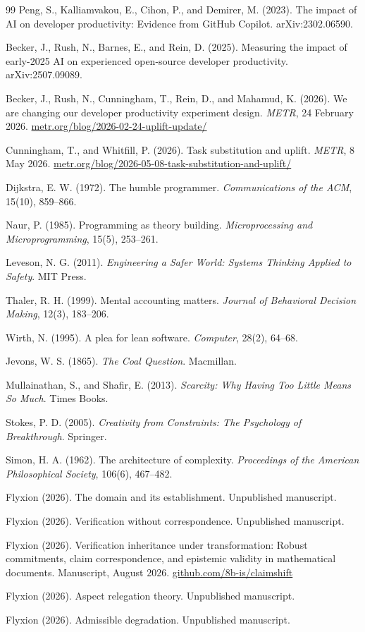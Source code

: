 \documentclass[11pt]{article}
\theoremstyle{remark}
\begin{document}
\begin{thebibliography}{99}
 Peng, S., Kalliamvakou, E., Cihon, P., and Demirer, M. (2023). The impact of AI on developer productivity: Evidence from GitHub Copilot. arXiv:2302.06590.

 Becker, J., Rush, N., Barnes, E., and Rein, D. (2025). Measuring the impact of early-2025 AI on experienced open-source developer productivity. arXiv:2507.09089.

 Becker, J., Rush, N., Cunningham, T., Rein, D., and Mahamud, K. (2026). We are changing our developer productivity experiment design. \emph{METR}, 24 February 2026. \url{metr.org/blog/2026-02-24-uplift-update/}

 Cunningham, T., and Whitfill, P. (2026). Task substitution and uplift. \emph{METR}, 8 May 2026. \url{metr.org/blog/2026-05-08-task-substitution-and-uplift/}

 Dijkstra, E. W. (1972). The humble programmer. \emph{Communications of the ACM}, 15(10), 859--866.

 Naur, P. (1985). Programming as theory building. \emph{Microprocessing and Microprogramming}, 15(5), 253--261.

 Leveson, N. G. (2011). \emph{Engineering a Safer World: Systems Thinking Applied to Safety}. MIT Press.

 Thaler, R. H. (1999). Mental accounting matters. \emph{Journal of Behavioral Decision Making}, 12(3), 183--206.

 Wirth, N. (1995). A plea for lean software. \emph{Computer}, 28(2), 64--68.

 Jevons, W. S. (1865). \emph{The Coal Question}. Macmillan.

 Mullainathan, S., and Shafir, E. (2013). \emph{Scarcity: Why Having Too Little Means So Much}. Times Books.

 Stokes, P. D. (2005). \emph{Creativity from Constraints: The Psychology of Breakthrough}. Springer.

 Simon, H. A. (1962). The architecture of complexity. \emph{Proceedings of the American Philosophical Society}, 106(6), 467--482.

 Flyxion (2026). The domain and its establishment. Unpublished manuscript.

 Flyxion (2026). Verification without correspondence. Unpublished manuscript.

 Flyxion (2026). Verification inheritance under transformation: Robust commitments, claim correspondence, and epistemic validity in mathematical documents. Manuscript, August 2026. \url{github.com/8b-is/claimshift}

 Flyxion (2026). Aspect relegation theory. Unpublished manuscript.

 Flyxion (2026). Admissible degradation. Unpublished manuscript.

\end{thebibliography}
\end{document}
